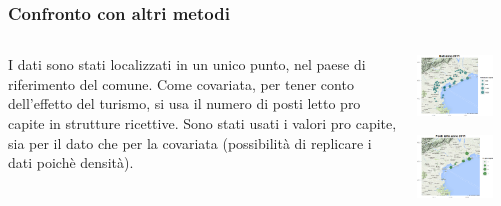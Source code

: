 \documentclass[landscape,9pt]{beamer}                           %
\begin{document}
\begin{frame}
\frametitle{Confronto con altri metodi}
\begin{columns}
	\begin{column}{0.6\textwidth}
	I dati sono stati localizzati in un unico punto, nel paese di riferimento del comune.
	\newline\newline
	Come covariata, per tener conto dell'effetto del turismo, si usa il numero di posti letto pro capite in strutture ricettive.
	\newline\newline
	Sono stati usati i valori pro capite, sia per il dato che per la covariata (possibilità di replicare i dati poichè densità).
	\end{column}
	\begin{column}{0.4\textwidth}
	\begin{center}
		\includegraphics[width=0.8\textwidth]{Immagini/Dati.png}
	\end{center}
	\begin{center}
		\includegraphics[width=0.8\textwidth]{Immagini/PL.png}
	\end{center}		
	\end{column}
\end{columns}
\end{frame}
\end{document}
